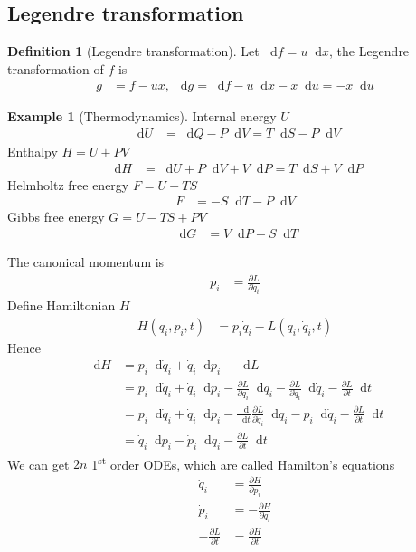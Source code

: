 \documentclass[twoside,9pt]{article}
\numberwithin{equation}{section} %
\newcommand{\lms}{\fontfamily{lmss}\selectfont} %
\renewcommand*\d{\mathop{}\!\mathrm{d}}
\theoremstyle{definition}
\newtheorem{definition}{\lms Definition}[section]
\newtheorem{example}{\lms Example}[section]
\theoremstyle{remark}
\begin{document}
\subsection{Legendre transformation}
\begin{definition}[Legendre transformation]
Let $\d f = u\d x$, the Legendre transformation of $f$ is
\begin{align}
    g &= f - ux,~ \d g = \d f - u\d x - x\d u = -x\d u
\end{align}
\end{definition}
\begin{example}[Thermodynamics]
Internal energy $U$
\begin{align*}
    \d U &= \d Q - P\d V
    = T\d S - P\d V
\end{align*}
Enthalpy $H= U + PV$
\begin{align*}
    \d H &= \d U + P\d V + V\d P
    = T\d S + V\d P
\end{align*}
Helmholtz free energy $F = U-TS$
\begin{align*}
    F &= -S\d T - P\d V
\end{align*}
Gibbs free energy $G = U - TS + PV$
\begin{align*}
    \d G &= V \d P - S\d T
\end{align*}
\end{example}

The canonical momentum is
\begin{align}
    p_i &= \frac{\partial L}{\partial\dot q_i}
\end{align}
Define Hamiltonian $H$
\begin{align}
    H(q_i,p_i,t) &= 
    p_i\dot q_i - L(q_i,\dot q_i, t)
\end{align}
Hence
\begin{align}
    \d H &= p_i\d\dot q_i + \dot q_i\d p_i - \d L\\
    &= p_i\d \dot q_i + \dot q_i \d p_i 
    - \frac{\partial L}{\partial q_i}\d q_i
    - \frac{\partial L}{\partial \dot q_i}\d\dot q_i
    - \frac{\partial L}{\partial t}\d t\\
    &= p_i\d \dot q_i + \dot q_i \d p_i 
    - \frac{\d}{\d t}\frac{\partial L}{\partial\dot q_i}\d q_i
    - p_i \d\dot q_i
    - \frac{\partial L}{\partial t}\d t\\
    &= \dot q_i\d p_i - \dot p_i\d q_i - \frac{\partial L}{\partial t}\d t
\end{align}
We can get $2n$ 1\textsuperscript{st} order ODEs,
which are called Hamilton's equations
\begin{align}
    \dot q_i &= \frac{\partial H}{\partial p_i}\\
    \dot p_i &= -\frac{\partial H}{\partial q_i}\\
    -\frac{\partial L}{\partial t} &= \frac{\partial H}{\partial t}
\end{align}
\end{document}
